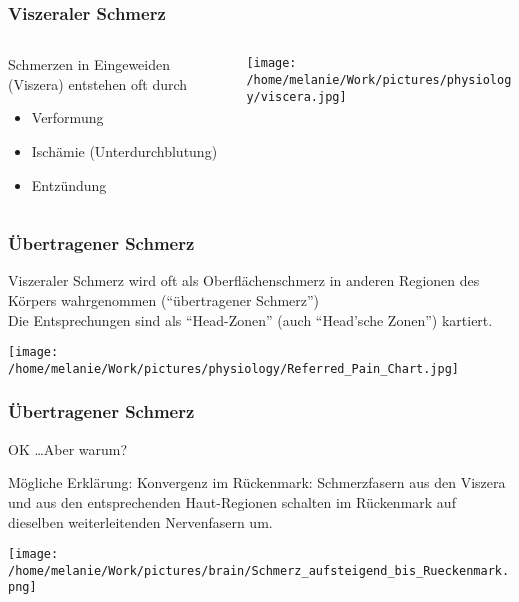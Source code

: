 \documentclass{beamer}
\begin{document}
\begin{frame}
\frametitle{Viszeraler Schmerz}

\begin{columns}[c]


\begin{column}{5cm}
Schmerzen in Eingeweiden (Viszera) entstehen oft durch
 
\begin{itemize}
\item
Verformung
\item
Ischämie (Unterdurchblutung)
\item
Entzündung
\end{itemize}
\end{column}

\begin{column}{5cm}
\begin{center}
\texttt{[image: /home/melanie/Work/pictures/physiology/viscera.jpg]}
\end{center}

\end{column}

\end{columns}


\end{frame}

\begin{frame}
\frametitle{Übertragener Schmerz}

Viszeraler Schmerz wird oft als Oberflächenschmerz in anderen Regionen des Körpers wahrgenommen (``übertragener Schmerz'') \\
Die Entsprechungen sind als ``Head-Zonen'' (auch ``Head'sche Zonen'') kartiert.


\begin{center}
\texttt{[image: /home/melanie/Work/pictures/physiology/Referred\_Pain\_Chart.jpg]}
\end{center}

\end{frame}

\begin{frame}
\frametitle{Übertragener Schmerz}

OK \dots Aber warum? 


\pause

Mögliche Erklärung: Konvergenz im Rückenmark: Schmerzfasern aus den Viszera und aus den entsprechenden Haut-Regionen schalten im Rückenmark auf dieselben weiterleitenden Nervenfasern um. \\


\begin{center}
\texttt{[image: /home/melanie/Work/pictures/brain/Schmerz\_aufsteigend\_bis\_Rueckenmark.png]}
\end{center}



\end{frame}
\end{document}
